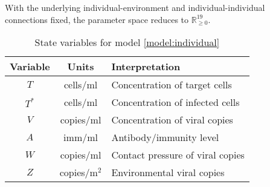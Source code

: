\documentclass[11pt]{article}
\numberwithin{equation}{subsection}
\begin{document}
    With the underlying individual-environment and individual-individual
    connections fixed, the parameter space reduces to $\mathbb{R}_{\geq
    0}^{19}$.



    \begin{table}[h!]
        \centering
        \caption{State variables for model \ref{model:individual}}
        \vspace{1em}
        \begin{tabular}{ccl} \hline\hline
            Variable    & Units     & Interpretation \\\hline\hline
            $T$         & cells/ml  & Concentration of target cells \\
            $T^*$       & cells/ml  & Concentration of infected cells \\
            $V$         & copies/ml & Concentration of viral copies \\
            $A$         & imm/ml    & Antibody/immunity level \\
            $W$         & copies/ml
                                    & Contact pressure of viral copies \\
            $Z$         & copies/m$^2$
                                    & Environmental viral copies \\
            \hline
        \end{tabular}
        \label{tab:state}
    \end{table}
\end{document}
